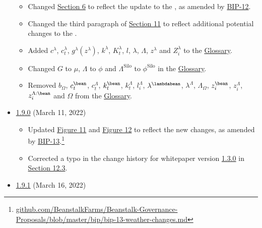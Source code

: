 \documentclass[class=article, crop=false]{standalone}
\begin{document}
\begin{itemize}[topsep=0pt, itemsep=3pt,leftmargin=16pt]
\begin{itemize}
        \item Changed \hyperlink{section.6}{Section 6} to reflect the update to the , as amended by \href{https://github.com/BeanstalkFarms/Beanstalk-Governance-Proposals/blob/master/bip/bip-12-silo-generalization.md}{BIP-12}. 
        \item Changed the third paragraph of \hyperlink{section.11}{Section 11} to reflect additional potential changes to the . 
        \item Added  $c^{\lambda}$, $c_{t}^{\lambda}$, $g^{\lambda}(z^{\lambda})$, $k^{\lambda}$, $K_{t}^{\lambda}$, $l$, $\lambda$, $\Lambda$, $z^{\lambda}$ and $Z_i^{\lambda}$ to the \hyperlink{subsection.12.2}{Glossary}. 
        \item Changed $G$ to $\mu$, $\Lambda$ to $\phi$ and $\Lambda^{\text{Silo}}$ to $\phi^{\text{Silo}}$ in the \hyperlink{subsection.12.2}{Glossary}. 
        \item Removed $b_{\Omega}$, $c_{t}^{\bean}$, $c_{t}^{\Lambda}$, $k_{t}^{\bean}$, $k_{t}^{\Lambda}$, $l_{i}^{\Lambda}$, $\lambda^{\lambdabean}$, $\lambda^{\Lambda}$, ${\Lambda}_{\Omega}$, $z_{i}^{\bean}$, $z_{i}^{\Lambda}$, $z_{i}^{\Lambda:\bean}$ and $\Omega$ from the \hyperlink{subsection.12.2}{Glossary}.
    \end{itemize}
        \item \href{https://github.com/BeanstalkFarms/Beanstalk/blob/master/version-history/beanstalk1_9_0.pdf}{1.9.0} (March 11, 2022)
    \begin{itemize}
        \item Updated \hyperref[fig 11]{Figure 11} and \hyperref[fig 12]{Figure 12} to reflect the new  changes, as amended by \href{https://github.com/BeanstalkFarms/Beanstalk-Governance-Proposals/blob/master/bip/bip-13-weather-changes.md}{BIP-13}.\footnote{\href{https://github.com/BeanstalkFarms/Beanstalk-Governance-Proposals/blob/master/bip/bip-13-weather-changes.md}{github.com/BeanstalkFarms/Beanstalk-Governance-Proposals/blob/master/bip/bip-13-weather-changes.md}}
        \item Corrected a typo in the change history for whitepaper version \href{https://github.com/BeanstalkFarms/Beanstalk/blob/master/version-history/beanstalk1_3_0.pdf}{1.3.0} in \hyperlink{subsection.12.3}{Section 12.3}.
    \end{itemize}
        \item \href{https://github.com/BeanstalkFarms/Beanstalk/blob/master/version-history/beanstalk1_9_1.pdf}{1.9.1} (March 16, 2022)
    \begin{itemize}

\end{itemize}
\end{itemize}
\end{document}
